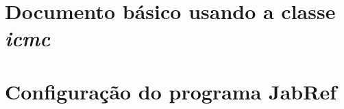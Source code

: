 \documentclass[doutorado, pre-defesa]{packages/icmc}
\begin{document}




\begin{apendicesenv}

    \chapter{Documento básico usando a classe \textit{icmc}}
    \label{chapter:documento-basico}
    

    \chapter{Configuração do programa JabRef}
    \label{chapter:configuracao-jabref}
    

\end{apendicesenv}



\glsaddall
\printglossaries
\end{document}
